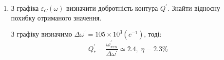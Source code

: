 \documentclass[a4paper, 12pt]{article}
\begin{document}
\begin{enumerate}
    \item З графіка $\varepsilon_C(\omega)$ визначити добротність контура $Q^{'}$.
    Знайти відносну похибку отриманого значення.

    З графіку визначимо $\Delta \omega^{'} = 105 \times 10^3(c^{-1})$, тоді:
    $$ Q_*^{'} = \frac{\omega_{res}^{'}}{\Delta \omega^{'}} \simeq 2.4 ,\; \eta = 2.3\%$$


\end{enumerate}
\end{document}
